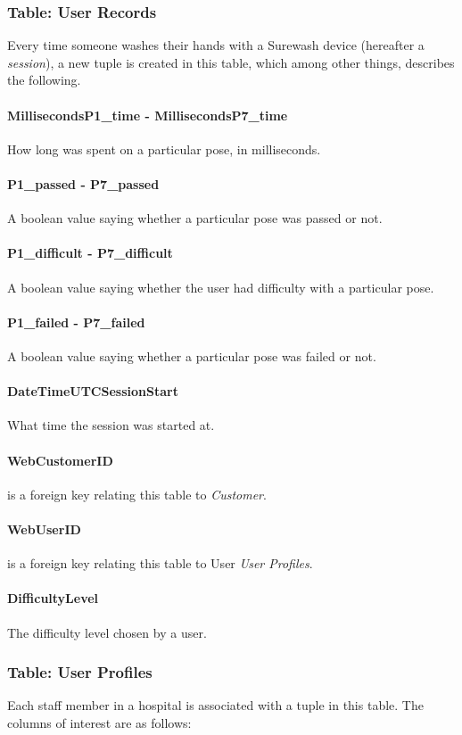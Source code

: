         \subsubsection{Table: User Records} Every time someone washes their hands with a Surewash device (hereafter a {\slshape session}), a new tuple is created in this table, which among other things, describes the following.
            \paragraph{MillisecondsP1\_time - MillisecondsP7\_time} How long was spent on a particular pose, in milliseconds.
            \paragraph{P1\_passed - P7\_passed} A boolean value saying whether a particular pose was passed or not.
            \paragraph{P1\_difficult - P7\_difficult} A boolean value saying whether the user had difficulty with a particular pose.
            \paragraph{P1\_failed - P7\_failed} A boolean value saying whether a particular pose was failed or not.
            \paragraph{DateTimeUTCSessionStart} What time the session was started at.
            \paragraph{WebCustomerID} is a foreign key relating this table to {\slshape Customer}.
            \paragraph{WebUserID} is a foreign key relating this table to User {\slshape User Profiles}.
            \paragraph{DifficultyLevel} The difficulty level chosen by a user.
        \subsubsection{Table: User Profiles} Each staff member in a hospital is associated with a tuple in this table. The columns of interest are as follows:

